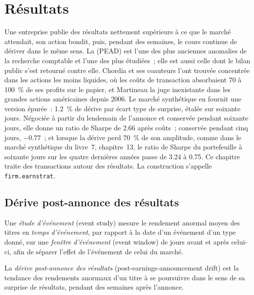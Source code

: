 \chapter{Résultats}\label{ch:s1:earnings}

Une entreprise publie des résultats nettement supérieurs à ce que le marché attendait, son action bondit, puis, pendant des semaines, le cours continue de dériver dans le même sens. La
 (PEAD) est l'une des plus anciennes anomalies de la recherche comptable et l'une des plus étudiées~; elle est aussi celle dont le bilan public
s'est retourné contre elle. Chordia et ses coauteurs l'ont trouvée concentrée dans les actions les moins liquides, où les coûts de transaction absorbaient 70 à 100~\% de ses profits sur le papier,
et Martineau la juge inexistante dans les grandes actions américaines depuis 2006. Le marché synthétique en fournit une version épurée~: 1.2~\% de dérive par écart type de
surprise, étalée sur soixante jours. Négociée à partir du lendemain de l'annonce et conservée pendant soixante jours, elle donne un ratio de Sharpe de 2.66 après coûts~; conservée pendant
cinq jours, $-0.77$~; et lorsque la dérive perd 70~\% de son amplitude, comme dans le marché synthétique du livre~7, chapitre~13, le ratio de Sharpe du portefeuille à soixante jours sur les
quatre dernières années passe de 3.24 à 0.75. Ce chapitre traite des transactions autour des résultats. La construction s'appelle \texttt{firm.earnstrat}.

\section{Dérive post-annonce des résultats}

\begin{definition}\label{def:s1:earnings:event}
Une \emph{étude d'événement} (event study) mesure le rendement anormal moyen des titres en \emph{temps d'événement}, par rapport à la date d'un événement
d'un type donné, sur une \emph{fenêtre d'événement} (event window) de jours avant et après celui-ci, afin de séparer l'effet de l'événement de celui du marché.
\end{definition}

\begin{definition}\label{def:s1:earnings:pead}
La \emph{dérive post-annonce des résultats} (post-earnings-announcement drift) est la tendance des rendements anormaux d'un titre à se poursuivre dans le sens de
sa surprise de résultats, pendant des semaines après l'annonce.
\end{definition}

